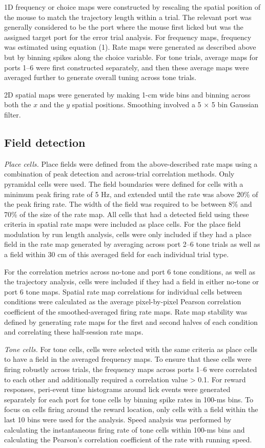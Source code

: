 1D frequency or choice maps were constructed by rescaling the spatial position of the mouse to match the trajectory length within a trial. The relevant port was generally considered to be the port where the mouse first licked but was the assigned target port for the error trial analysis. For frequency maps, frequency was estimated using equation (1). Rate maps were generated as described above but by binning spikes along the choice variable. For tone trials, average maps for ports 1--6 were first constructed separately, and then these average maps were averaged further to generate overall tuning across tone trials.

2D spatial maps were generated by making 1-cm wide bins and binning across both the $x$ and the $y$ spatial positions. Smoothing involved a 5 × 5 bin Gaussian filter.

\subsection{Field detection}

\textit{Place cells.} Place fields were defined from the above-described rate maps using a combination of peak detection and across-trial correlation methods. Only pyramidal cells were used. The field boundaries were defined for cells with a minimum peak firing rate of 5 Hz, and extended until the rate was above 20\% of the peak firing rate. The width of the field was required to be between 8\% and 70\% of the size of the rate map. All cells that had a detected field using these criteria in spatial rate maps were included as place cells. For the place field modulation by run length analysis, cells were only included if they had a place field in the rate map generated by averaging across port 2--6 tone trials as well as a field within 30 cm of this averaged field for each individual trial type.

For the correlation metrics across no-tone and port 6 tone conditions, as well as the trajectory analysis, cells were included if they had a field in either no-tone or port 6 tone maps. Spatial rate map correlations for individual cells between conditions were calculated as the average pixel-by-pixel Pearson correlation coefficient of the smoothed-averaged firing rate maps. Rate map stability was defined by generating rate maps for the first and second halves of each condition and correlating these half-session rate maps.

\textit{Tone cells.} For tone cells, cells were selected with the same criteria as place cells to have a field in the averaged frequency maps. To ensure that these cells were firing robustly across trials, the frequency maps across ports 1--6 were correlated to each other and additionally required a correlation value > 0.1. For reward responses, peri-event time histograms around lick events were generated separately for each port for tone cells by binning spike rates in 100-ms bins. To focus on cells firing around the reward location, only cells with a field within the last 10 bins were used for the analysis. Speed analysis was performed by calculating the instantaneous firing rate of tone cells within 100-ms bins and calculating the Pearson's correlation coefficient of the rate with running speed.


